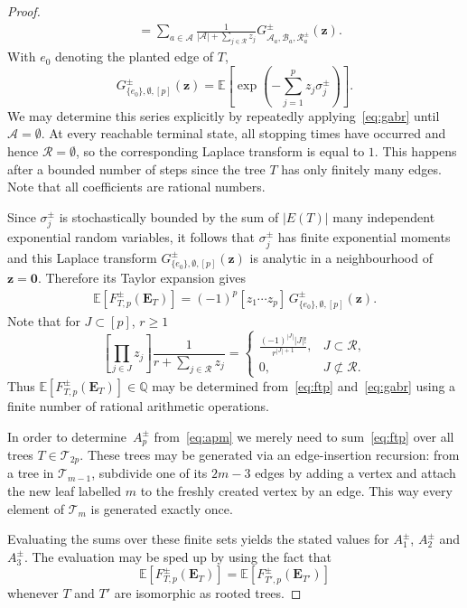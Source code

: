 \documentclass[english,11pt]{smfart}
\newcommand{\ndQ}{\mathbb{Q}}
\newcommand{\Ex}[1]{\mathbb{E}[#1]}
\newcommand{\Exb}[1]{\mathbb{E}\left[#1\right]}
\newcommand{\cA}{\mathcal{A}}
\newcommand{\cB}{\mathcal{B}}
\newcommand{\cR}{\mathcal{R}}
\newcommand{\cT}{\mathcal{T}}
\numberwithin{equation}{section}
\begin{document}
\begin{proof}
\begin{align}
		&= \sum_{a\in\cA}  \frac{1}{|\cA|+\sum_{j\in \cR}z_j}G_{\cA_a,\cB_a,\cR_a^\pm}^\pm(\bm z). \nonumber
	\end{align}
	With $e_0$ denoting the planted edge of $T$, 
	\[
		G_{\{e_0\}, \emptyset, [p]}^\pm(\bm z) = \Exb{\exp\left(-\sum_{j=1}^p z_j\sigma_j^\pm\right)}.
	\]
	We may determine this series explicitly by repeatedly
applying~\eqref{eq:gabr} until \(\cA=\emptyset\). At every reachable
terminal state, all stopping times have occurred and hence
\(\cR=\emptyset\), so the corresponding Laplace transform is equal to
\(1\). This happens after a bounded number of steps since the tree \(T\)
has only finitely many edges. Note that all coefficients are rational numbers.
	
	
	Since  $\sigma_j^\pm$ is stochastically bounded by the sum of $|E(T)|$ many independent exponential random variables, it follows that $\sigma_j^\pm$ has finite exponential moments and this Laplace transform $G_{\{e_0\}, \emptyset, [p]}^\pm(\bm{z})$ is analytic in a neighbourhood of $\bm{z} = \bm{0}$. Therefore its Taylor expansion gives
	\begin{align}
		\label{eq:ftp}
		\Ex{F_{T,p}^\pm(\bm E_T)} = (-1)^p[z_1\cdots z_p]\, G_{\{e_0\},\emptyset,[p]}^\pm(\bm z).
	\end{align}
	Note that for $J \subset [p]$, $r \ge 1$
	\[
	\left[\prod_{j\in J}z_j\right]\frac{1}{r+\sum_{j\in \cR}z_j} =
	\begin{cases}
		\frac{(-1)^{|J|}|J|!}{r^{|J|+1}},
		& J \subset \cR,\\[3mm]
		0,
		& J \not \subset \cR.
	\end{cases}
	\]
	Thus $\Ex{F_{T,p}^\pm(\bm E_T)} \in \ndQ$ may be determined from~\eqref{eq:ftp} and~\eqref{eq:gabr} using a finite number of rational arithmetic operations. 
	
	In order to determine~$A_p^\pm$ from~\eqref{eq:apm} we merely need to sum~\eqref{eq:ftp} over all trees $T \in \cT_{2p}$. These trees may be generated via an edge-insertion recursion: from a tree in $\cT_{m-1}$, subdivide one of its $2m-3$ edges by adding a vertex and attach the new leaf labelled $m$ to the freshly created vertex by an edge. This way every element of $\cT_m$ is generated exactly once. 
	\smallskip
    
	Evaluating the sums over these finite sets yields the stated values for $A_1^\pm$, $A_2^\pm$ and $A_3^\pm$.  The evaluation may be sped up by using the fact that 
	\[
		\Ex{F_{T,p}^\pm(\bm E_T)} = \Ex{F_{T',p}^\pm(\bm E_{T'})}
	\]
	whenever $T$ and $T'$ are isomorphic as rooted trees. 
\end{proof}
\end{document}
